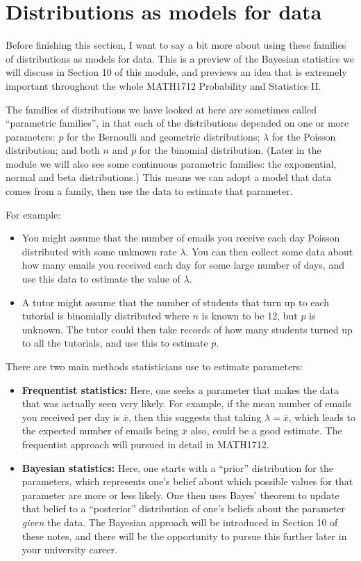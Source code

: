 \documentclass[
  a4paper,
]{book}
\providecommand{\tightlist}{%
  \setlength{\itemsep}{0pt}\setlength{\parskip}{0pt}}
\theoremstyle{definition}
\theoremstyle{definition}
\theoremstyle{definition}
\theoremstyle{definition}
\theoremstyle{remark}
\begin{document}
\hypertarget{models}{%
\section{Distributions as models for data}\label{models}}

Before finishing this section, I want to say a bit more about using these families of distributions as models for data. This is a preview of the Bayesian statistics we will discuss in Section 10 of this module, and previews an idea that is extremely important throughout the whole MATH1712 Probability and Statistics II.

The families of distributions we have looked at here are sometimes called ``parametric families'', in that each of the distributions depended on one or more parameters: \(p\) for the Bernoulli and geometric distributions; \(\lambda\) for the Poisson distribution; and both \(n\) and \(p\) for the binomial distribution. (Later in the module we will also see some continuous parametric families: the exponential, normal and beta distributions.) This means we can adopt a model that data comes from a family, then use the data to estimate that parameter.

For example:

\begin{itemize}
\tightlist
\item
  You might assume that the number of emails you receive each day Poisson distributed with some unknown rate \(\lambda\). You can then collect some data about how many emails you received each day for some large number of days, and use this data to estimate the value of \(\lambda\).
\item
  A tutor might assume that the number of students that turn up to each tutorial is binomially distributed where \(n\) is known to be 12, but \(p\) is unknown. The tutor could then take records of how many students turned up to all the tutorials, and use this to estimate \(p\).
\end{itemize}

There are two main methods statisticians use to estimate parameters:

\begin{itemize}
\tightlist
\item
  \textbf{Frequentist statistics:} Here, one seeks a parameter that makes the data that was actually seen very likely. For example, if the mean number of emails you received per day is \(\bar x\), then this suggests that taking \(\lambda = \bar x\), which leads to the expected number of emails being \(\bar x\) also, could be a good estimate. The frequentist approach will pursued in detail in MATH1712.
\item
  \textbf{Bayesian statistics:} Here, one starts with a ``prior'' distribution for the parameters, which represents one's belief about which possible values for that parameter are more or less likely. One then uses Bayes' theorem to update that belief to a ``posterior'' distribution of one's beliefs about the parameter \emph{given} the data. The Bayesian approach will be introduced in Section 10 of these notes, and there will be the opportunity to pursue this further later in your university career.
\end{itemize}
\end{document}

